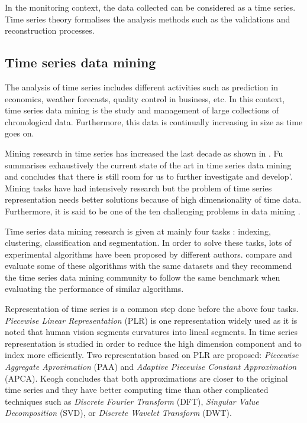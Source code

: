 In the monitoring context, the data collected can be considered as a time
series.  Time series theory formalises the analysis methods such as the validations and reconstruction processes.



\subsection{Time series data mining}

The analysis of time series includes different activities such as prediction in economics, weather forecasts, quality control in business, etc. In this context, time series data mining is the study and management of large collections of chronological data. Furthermore, this data is continually increasing in size as time goes on.

Mining research in time series has increased the last decade as shown in \textcite{fu11}. Fu summarises exhaustively the current state of the art in time series data mining  and concludes that there is still room for us to further investigate and develop'. Mining tasks have had intensively research but the problem of  time series representation needs better solutions because of high dimensionality of time data. Furthermore, it is said to be one of the ten challenging problems in data mining \parencite{yangwu06}.
 
Time series data mining research  is given at mainly four tasks \parencite{keogh02}: indexing, clustering, classification and segmentation. In order to solve these tasks, lots of experimental algorithms have been proposed by different authors. \textcite{keogh02} compare and evaluate some of these algorithms with the same datasets and they recommend the time series data mining community to follow the same benchmark when evaluating the performance of similar algorithms. 

Representation of time series is a common step done before the above four tasks.
\emph{Piecewise Linear Representation} (PLR) \parencite{keogh97,keogh98}  is one representation widely used as it is noted that human vision segments curvatures into lineal segments. In \textcite{keogh00,keogh01} time series representation is studied in order to reduce the high dimension component and to index more efficiently. Two representation based on PLR are proposed: \emph{Piecewise Aggregate Aproximation} (PAA) and \emph{Adaptive Piecewise Constant Approximation} (APCA). Keogh concludes that both approximations are closer to the original time series and they have better computing time than other complicated techniques such as \emph{Discrete Fourier Transform} (DFT), \emph{Singular Value Decomposition} (SVD), or \emph{Discrete Wavelet Transform} (DWT).



